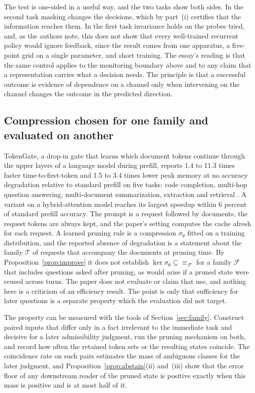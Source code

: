 \documentclass[11pt]{article}
\theoremstyle{definition}
\theoremstyle{remark}
\newcommand{\eqv}[1]{\equiv_{#1}}
\begin{document}
The test is one-sided in a useful way, and the two tasks show both sides. In the second task masking changes the decisions, which by part~(i) certifies that the information reaches them. In the first task invariance holds on the probes tried, and, as the authors note, this does not show that every well-trained recurrent policy would ignore feedback, since the result comes from one apparatus, a five-point grid on a single parameter, and short training. The essay's reading is that the same control applies to the monitoring boundary above and to any claim that a representation carries what a decision needs. The principle is that a successful outcome is evidence of dependence on a channel only when intervening on the channel changes the outcome in the predicted direction.

\subsection{Compression chosen for one family and evaluated on another}

TokenGate, a drop-in gate that learns which document tokens continue through the upper layers of a language model during prefill, reports 1.4 to 11.3 times faster time-to-first-token and 1.5 to 3.4 times lower peak memory at no accuracy degradation relative to standard prefill on five tasks: code completion, multi-hop question answering, multi-document summarization, extraction and retrieval \cite{tokengate}. A variant on a hybrid-attention model reaches its largest speedup within 6 percent of standard prefill accuracy. The prompt is a request followed by documents, the request tokens are always kept, and the paper's setting computes the cache afresh for each request. A learned pruning rule is a compression $\sigma_\theta$ fitted on a training distribution, and the reported absence of degradation is a statement about the family $\mathcal{T}$ of requests that accompany the documents at pruning time. By Proposition~\ref{prop:improve} it does not establish $\ker\sigma_\theta\subseteq\eqv{\mathcal{F}}$ for a family $\mathcal{F}$ that includes questions asked after pruning, as would arise if a pruned state were reused across turns. The paper does not evaluate or claim that use, and nothing here is a criticism of an efficiency result. The point is only that sufficiency for later questions is a separate property which the evaluation did not target.

The property can be measured with the tools of Section~\ref{sec:family}. Construct paired inputs that differ only in a fact irrelevant to the immediate task and decisive for a later admissibility judgment, run the pruning mechanism on both, and record how often the retained token sets or the resulting states coincide. The coincidence rate on such pairs estimates the mass of ambiguous classes for the later judgment, and Proposition~\ref{prop:abstain}(ii) and~(iii) show that the error floor of any downstream reader of the pruned state is positive exactly when this mass is positive and is at most half of it.
\end{document}

